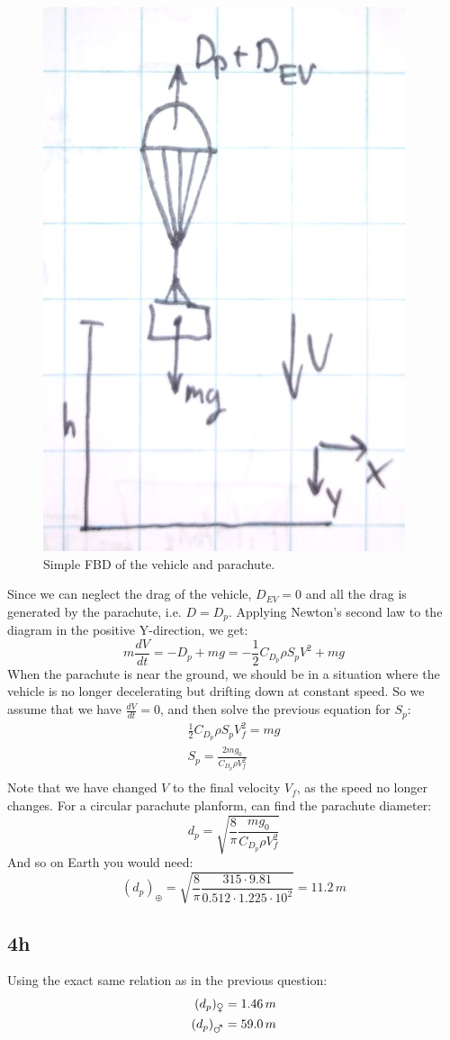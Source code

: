 \begin{figure}[H]
    \centering
    \includegraphics[width=0.3\columnwidth]{Figures/chute_fbd.jpg}
    \caption{Simple FBD of the vehicle and parachute.}
    \label{fig:chute_fbd}
\end{figure}
Since we can neglect the drag of the vehicle, $D_{EV} = 0$ and all the drag is generated by the parachute, i.e. $D = D_p$.
Applying Newton's second law to the diagram in the positive Y-direction, we get:
\begin{equation}
    m \frac{dV}{dt} = -D_p + mg = -\frac{1}{2} C_{D_p} \rho S_p V^2 + mg 
\end{equation}
When the parachute is near the ground, we should be in a situation where the vehicle is no longer decelerating but drifting down at constant speed. So we assume that we have $\frac{dV}{dt} = 0$, and then solve the previous equation for $S_p$:
\begin{equation}
\begin{split}
    \frac{1}{2} C_{D_p} \rho S_p V_f^2 = mg\\
    S_p = \frac{2 m g_0}{C_{D_p} \rho V_f^2}\\
\end{split}
\end{equation}
Note that we have changed $V$ to the final velocity $V_f$, as the speed no longer changes. For a circular parachute planform, can find the parachute diameter:
\begin{equation}
    d_p = \sqrt{\frac{8}{\pi} \frac{ m g_0}{C_{D_p} \rho V_f^2}}
\end{equation}
And so on Earth you would need:
\begin{equation}
    (d_p)_\oplus = \sqrt{\frac{8}{\pi} \frac{315 \cdot 9.81}{0.512 \cdot 1.225 \cdot 10^2}} = 11.2 \, m
\end{equation}

\subsection{4h}
Using the exact same relation as in the previous question:
\begin{equation}
\begin{split}
(d_p)_{\venus} = 1.46 \, m \\
(d_p)_{\mars} = 59.0 \, m \\
\end{split}
\end{equation}

